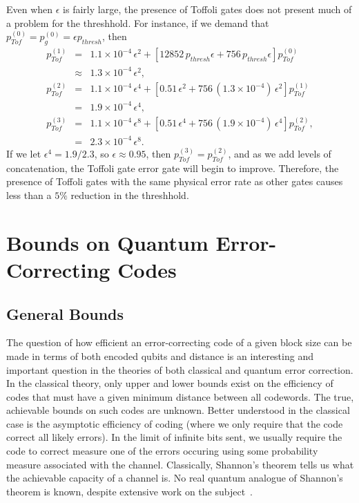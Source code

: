 \documentclass{report}
\newcommand{\ptj}[1]{p_{Tof}^{({#1})}}
\newcommand{\pgj}[1]{p_g^{({#1})}}
\begin{document}
Even when $\epsilon$ is fairly large, the presence of Toffoli gates does
not present much of a problem for the threshhold.  For instance, if we demand 
that $\ptj{0} = \pgj{0} = \epsilon p_{thresh}$, then
\begin{eqnarray}
\ptj{1} & = & 1.1 \times 10^{-4}\,\epsilon^2 + \left[12852\,p_{thresh} \epsilon 
+ 756\,p_{thresh} \epsilon \right] \ptj{0} \\
& \approx & 1.3 \times 10^{-4}\,\epsilon^2, \\
\ptj{2} & = & 1.1 \times 10^{-4}\,\epsilon^4 + \left[0.51\,\epsilon^2 + 
756\,(1.3 \times 10^{-4})\,\epsilon^2 \right] \ptj{1} \\
& = & 1.9 \times 10^{-4}\,\epsilon^4, \\
\ptj{3} & = & 1.1 \times 10^{-4}\,\epsilon^8 + \left[0.51\,\epsilon^4 + 
756\,(1.9 \times 10^{-4})\,\epsilon^4 \right] \ptj{2}, \\
& = & 2.3 \times 10^{-4}\,\epsilon^8.
\end{eqnarray}
If we let $\epsilon^4 = 1.9 / 2.3$, so $\epsilon \approx 0.95$, then $\ptj{3} = 
\ptj{2}$, and as we add levels of concatenation, the Toffoli gate error gate 
will begin to improve.  Therefore, the presence of Toffoli gates with the same 
physical error rate as other gates causes less than a $5\%$ reduction in the 
threshhold.
\pagestyle{myheadings}

\chapter{Bounds on Quantum Error-Correcting Codes}
\label{chap-bounds}

\section{General Bounds}
\label{sec-gen-bounds}
\pagestyle{headings}

The question of how efficient an error-correcting code of a given block size 
can be made in terms of both encoded qubits and distance is an interesting 
and important question in the theories of both classical and quantum error 
correction.  In the classical theory, only upper and lower bounds exist on 
the efficiency of codes that must have a given minimum distance between 
all codewords.  The true, achievable bounds on such codes are unknown.  
Better understood in the classical case is the asymptotic efficiency of coding 
(where we only require that the code correct all likely errors).  In the limit 
of infinite bits sent, we usually require the code to correct measure one of 
the errors occuring using some probability measure associated with the channel. 
Classically, Shannon's theorem tells us what the achievable capacity of a 
channel is.  No real quantum analogue of Shannon's theorem is known, despite
extensive work on the subject~\cite{lloyd, schumacher, barnum}.
\end{document}
